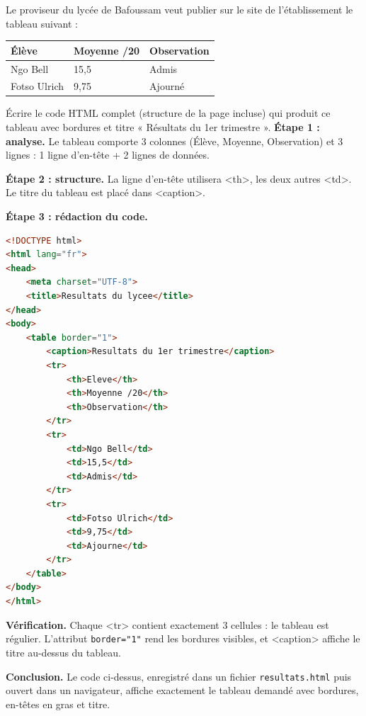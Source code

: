 \documentclass[11pt]{article}
\newcommand{\cle}[1]{{\popxbold\color{popdark}#1}}
\begin{document}
\begin{exoresolu}
Le proviseur du lycée de Bafoussam veut publier sur le site de l'établissement le tableau suivant :
\begin{center}
\begin{tabularx}{\linewidth}{|l|X|X|}\hline
\rowcolor{popblueL}\textbf{Élève} & \textbf{Moyenne /20} & \textbf{Observation} \\ \hline
Ngo Bell & 15,5 & Admis \\ \hline
Fotso Ulrich & 9,75 & Ajourné \\ \hline
\end{tabularx}
\end{center}
Écrire le code HTML complet (structure de la page incluse) qui produit ce tableau avec bordures et titre « Résultats du 1er trimestre ».
\tcblower
\textbf{Étape 1 : analyse.} Le tableau comporte 3 colonnes (Élève, Moyenne, Observation) et 3 lignes : 1 ligne d'en-tête + 2 lignes de données.

\textbf{Étape 2 : structure.} La ligne d'en-tête utilisera \cle{<th>}, les deux autres \cle{<td>}. Le titre du tableau est placé dans \cle{<caption>}.

\textbf{Étape 3 : rédaction du code.}
\begin{lstlisting}[language=HTML]
<!DOCTYPE html>
<html lang="fr">
<head>
    <meta charset="UTF-8">
    <title>Resultats du lycee</title>
</head>
<body>
    <table border="1">
        <caption>Resultats du 1er trimestre</caption>
        <tr>
            <th>Eleve</th>
            <th>Moyenne /20</th>
            <th>Observation</th>
        </tr>
        <tr>
            <td>Ngo Bell</td>
            <td>15,5</td>
            <td>Admis</td>
        </tr>
        <tr>
            <td>Fotso Ulrich</td>
            <td>9,75</td>
            <td>Ajourne</td>
        </tr>
    </table>
</body>
</html>
\end{lstlisting}
\textbf{Vérification.} Chaque \cle{<tr>} contient exactement 3 cellules : le tableau est régulier. L'attribut \texttt{border="1"} rend les bordures visibles, et \cle{<caption>} affiche le titre au-dessus du tableau.

\textbf{Conclusion.} Le code ci-dessus, enregistré dans un fichier \texttt{resultats.html} puis ouvert dans un navigateur, affiche exactement le tableau demandé avec bordures, en-têtes en gras et titre.
\end{exoresolu}
\end{document}
